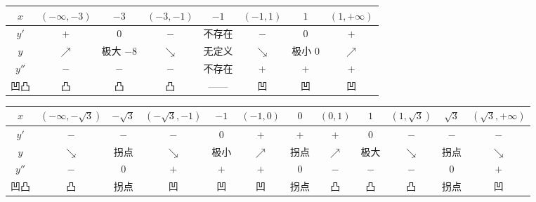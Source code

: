 \begin{center}
\footnotesize\setlength{\tabcolsep}{1.5pt}
\begin{tabular}{@{}c|ccccccc@{}}
$x$ & $(-\infty,-3)$ & $-3$ & $(-3,-1)$ & $-1$ & $(-1,1)$ & $1$ & $(1,+\infty)$ \\
\hline
$y'$ & $+$ & $0$ & $-$ & 不存在 & $-$ & $0$ & $+$ \\
$y$ & $\nearrow$ & 极大 $-8$ & $\searrow$ & 无定义 & $\searrow$ & 极小 $0$ & $\nearrow$ \\
$y''$ & $-$ & $-$ & $-$ & 不存在 & $+$ & $+$ & $+$ \\
凹凸 & 凸 & 凸 & 凸 & —— & 凹 & 凹 & 凹 \\
\end{tabular}
\end{center}

\begin{center}
\footnotesize\setlength{\tabcolsep}{1.5pt}
\begin{tabular}{@{}c|ccccccccccc@{}}
$x$ & $(-\infty,-\sqrt3)$ & $-\sqrt3$ & $(-\sqrt3,-1)$ & $-1$ & $(-1,0)$ & $0$ & $(0,1)$ & $1$ & $(1,\sqrt3)$ & $\sqrt3$ & $(\sqrt3,+\infty)$ \\
\hline
$y'$ & $-$ & $-$ & $-$ & $0$ & $+$ & $+$ & $+$ & $0$ & $-$ & $-$ & $-$ \\
$y$ & $\searrow$ & 拐点 & $\searrow$ & 极小 & $\nearrow$ & 拐点 & $\nearrow$ & 极大 & $\searrow$ & 拐点 & $\searrow$ \\
$y''$ & $-$ & $0$ & $+$ & $+$ & $+$ & $0$ & $-$ & $-$ & $-$ & $0$ & $+$ \\
凹凸 & 凸 & 拐点 & 凹 & 凹 & 凹 & 拐点 & 凸 & 凸 & 凸 & 拐点 & 凹 \\
\end{tabular}
\end{center}
